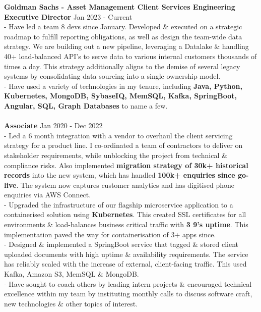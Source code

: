 \documentclass[a4paper,10pt]{article}
\begin{document}
		\textbf{Goldman Sachs - Asset Management Client Services Engineering}
		\\\textbf{Executive Director}  \hfill Jan 2023 - Current 
		\\ - Have led a team 8 devs since January. Developed \& executed on a strategic roadmap to fulfill reporting obligations, as well as design the team-wide data strategy. We are building out a new pipeline, leveraging a Datalake \& handling 40+ load-balanced API's to serve data to various internal customers thousands of times a day. This strategy additionally aligns to the demise of several legacy systems by consolidating data sourcing into a single ownership model.
		\\ - Have used a variety of technologies in my tenure, including \textbf{Java, Python, Kubernetes, MongoDB, SybaseIQ, MemSQL, Kafka, SpringBoot, Angular, SQL, Graph Databases} to name a few.
		\\\\
		\textbf{Associate}  \hfill Jan 2020 - Dec 2022
		\\ - Led a 6 month integration with a vendor to overhaul the client servicing strategy for a product line. I co-ordinated a team of contractors to deliver on stakeholder requirements, while unblocking the project from technical \& compliance risks. Also implemented \textbf{migration strategy of 30k+ historical records} into the new system, which has handled \textbf{100k+ enquiries since go-live}. The system now captures customer analytics and has digitised phone enquiries via AWS Connect.
		\\ - Upgraded the infrastructure of our flagship microservice application to a containerised solution using \textbf{Kubernetes}. This created SSL certificates for all environments \& load-balances business critical traffic with \textbf{3 9's uptime}. This implementation paved the way for containerisation of 3+ apps since.
		\\ - Designed \& implemented a SpringBoot service that tagged \& stored client uploaded documents with high uptime \& availability requirements. The service has reliably scaled with the increase of external, client-facing traffic. This used Kafka, Amazon S3, MemSQL \& MongoDB.
		\\ - Have sought to coach others by leading intern projects \& encouraged technical excellence within my team by instituting monthly calls to discuss software craft,  new technologies \& other topics of interest.
		\\\\
\end{document}
